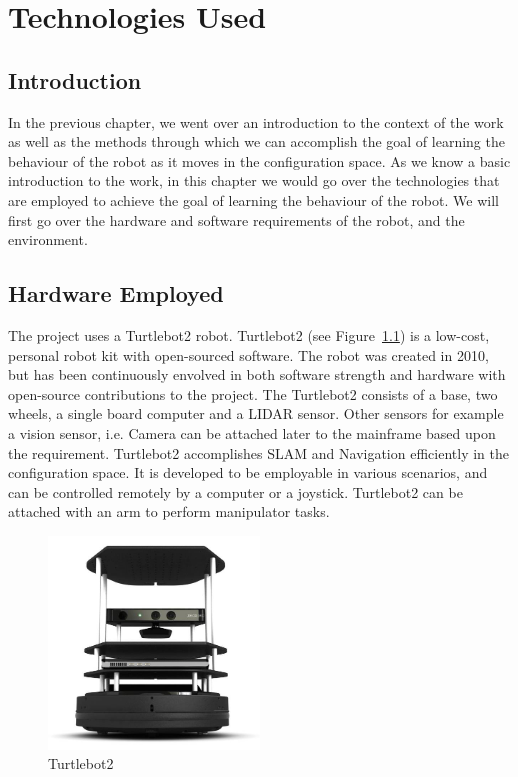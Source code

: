 
\chapter{Technologies Used} %

\label{Chapter2} %

\section{Introduction}
In the previous chapter, we went over an introduction to the context of the work as well as the methods through which we can accomplish the goal of learning the behaviour of the robot as it moves in the configuration space.
As we know a basic introduction to the work,  in this chapter we would go over the technologies that are employed to achieve the goal of learning the behaviour of the robot. We will first go over the hardware and software requirements of the robot, and the environment.
\section{Hardware Employed}
The project uses a Turtlebot2 \cite{t2} robot. Turtlebot2 (see Figure~\ref{fig:Turtlebot2}) is a low-cost, personal robot kit with open-sourced software. The robot was created in 2010, but has been continuously envolved in both 
software strength and hardware with open-source contributions to the project. The Turtlebot2 consists of a base, two wheels, a single board computer and a LIDAR sensor. Other sensors for example a vision sensor, i.e. Camera can be attached later to the mainframe based upon the requirement.
Turtlebot2 accomplishes SLAM and Navigation efficiently in the configuration space. It is developed to be employable in various scenarios, and can be controlled remotely by a computer or a joystick. 
Turtlebot2 can be attached with an arm to perform manipulator tasks.

\begin{figure}[th]
    \centering
    \includegraphics[width=0.5\textwidth]{Figures/turtlebot2.jpg}
    \decoRule
    \caption[]{Turtlebot2}
    \label{fig:Turtlebot2}
    \end{figure}

